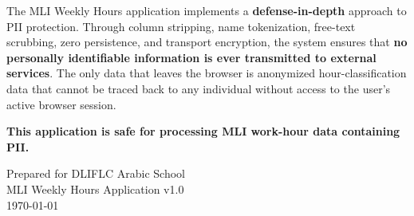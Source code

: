 \documentclass[11pt,letterpaper]{article}
\begin{document}
\begin{tcolorbox}[safestyle, title={Conclusion}]
The MLI Weekly Hours application implements a \textbf{defense-in-depth} approach to PII protection. Through column stripping, name tokenization, free-text scrubbing, zero persistence, and transport encryption, the system ensures that \textbf{no personally identifiable information is ever transmitted to external services}. The only data that leaves the browser is anonymized hour-classification data that cannot be traced back to any individual without access to the user's active browser session.

\vspace{6pt}
\textbf{This application is safe for processing MLI work-hour data containing PII.}
\end{tcolorbox}

\vfill
\begin{center}
\small\color{gray}
Prepared for DLIFLC Arabic School\\
MLI Weekly Hours Application v1.0\\
\today
\end{center}
\end{document}
